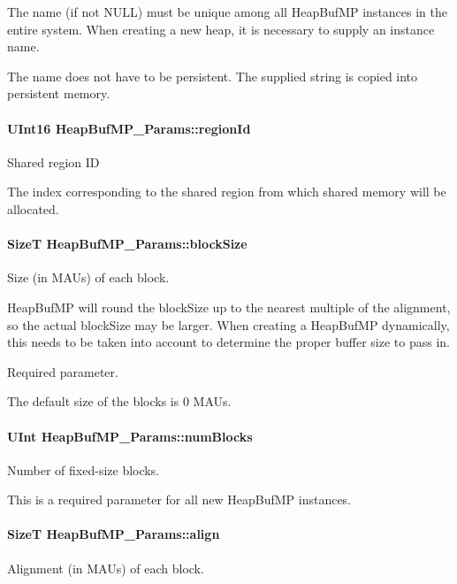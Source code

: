 The name (if not NULL) must be unique among all HeapBufMP instances in the entire system. When creating a new heap, it is necessary to supply an instance name.

The name does not have to be persistent. The supplied string is copied into persistent memory. 
\paragraph[{regionId}]{\setlength{\rightskip}{0pt plus 5cm}UInt16 {\bf HeapBufMP\_\-Params::regionId}}\hfill\label{struct_heap_buf_m_p___params_a22f33c326f94898613b8d40335be4eee}
Shared region ID

The index corresponding to the shared region from which shared memory will be allocated. 
\paragraph[{blockSize}]{\setlength{\rightskip}{0pt plus 5cm}SizeT {\bf HeapBufMP\_\-Params::blockSize}}\hfill\label{struct_heap_buf_m_p___params_afc5038de12c1e9bf75d642c1081b74ac}
Size (in MAUs) of each block.

HeapBufMP will round the blockSize up to the nearest multiple of the alignment, so the actual blockSize may be larger. When creating a HeapBufMP dynamically, this needs to be taken into account to determine the proper buffer size to pass in.

Required parameter.

The default size of the blocks is 0 MAUs. 
\paragraph[{numBlocks}]{\setlength{\rightskip}{0pt plus 5cm}UInt {\bf HeapBufMP\_\-Params::numBlocks}}\hfill\label{struct_heap_buf_m_p___params_a4e85da751892052ed1fddc3376f64d9d}
Number of fixed-\/size blocks.

This is a required parameter for all new HeapBufMP instances. 
\paragraph[{align}]{\setlength{\rightskip}{0pt plus 5cm}SizeT {\bf HeapBufMP\_\-Params::align}}\hfill\label{struct_heap_buf_m_p___params_a0b16778e64598aca34ee44c746374203}
Alignment (in MAUs) of each block.

